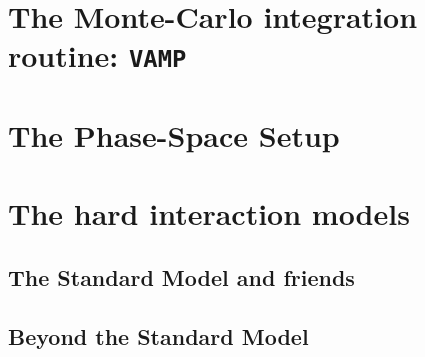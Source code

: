\documentclass[12pt]{book}
\newcommand{\ttt}[1]{\texttt{#1}}
\begin{document}
\section{The Monte-Carlo integration routine: \ttt{VAMP}} 


\section{The Phase-Space Setup}


\section{The hard interaction models}

\subsection{The Standard Model and friends}


\subsection{Beyond the Standard Model}
\end{document}
